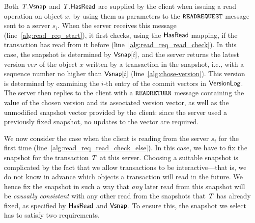 Both $\mathit{T}.\mathsf{Vsnap}$ and $\mathit{T}.\mathsf{HasRead}$ are supplied by the client when issuing a read operation on object $x$, by using them as parameters to the ${\tt READREQUEST}$ message sent to a server $s_i$. When the server receives this message (line~\ref{alg:read_req_start}), it first checks, using the $\mathsf{HasRead}$ mapping, if the transaction has read from it before (line~\ref{alg:read_req_read_check}). In this case, the snapshot is determined by $\mathsf{Vsnap}[i]$, and the server returns the latest version $\mathit{ver}$ of the object $x$ written by a transaction in the snapshot, i.e., with a sequence number no higher than $\mathsf{Vsnap}[i]$ (line~\ref{alg:chose-version}). This version is determined by examining the $i$-th entry of the commit vectors in $\mathsf{VersionLog}$. The server then replies to the client with a ${\tt READRETURN}$ message containing the value of the chosen version and its associated version vector, as well as the unmodified snapshot vector provided by the client: since the server used a previously fixed snapshot, no updates to the vector are required.


We now consider the case when the client is reading from the server $s_i$ for the first time (line~\ref{alg:read_req_read_check_else}). In this case, we have to fix the snapshot for the transaction $\mathit{T}$ at this server. Choosing a suitable snapshot is complicated by the fact that we allow transactions to be interactive---that is, we do not know in advance which objects a transaction will read in the future. We hence fix the snapshot in such a way that \emph{any} later read from this snapshot will be \emph{causally consistent} with any other read from the snapshots that $\mathit{T}$ has already fixed, as specified by $\mathsf{HasRead}$ and $\mathsf{Vsnap}$. To ensure this, the snapshot we select has to satisfy two requirements.

